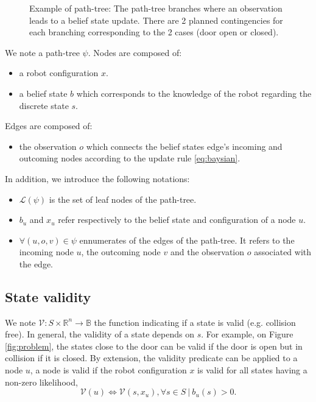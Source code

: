\documentclass[letterpaper, 10 pt, conference]{ieeeconf}  %
\begin{document}
\begin{figure}[!htb]
 \caption{Example of path-tree: The path-tree branches where an observation leads to a belief state update. There are 2 planned contingencies for each branching corresponding to the 2 cases (door open or closed).}
 \label{fig:path_tree}
\end{figure}

We note a path-tree $\psi$. Nodes are composed of:
\begin{itemize}
\item a robot configuration $x$.
\item a belief state $b$ which corresponds to the knowledge of the robot regarding the discrete state $s$.
\end{itemize}

Edges are composed of:
\begin{itemize}
\item the observation $o$ which connects the belief states edge's incoming and outcoming nodes according to the update rule \ref{eq:baysian}.
\end{itemize}

In addition, we introduce the following notations:
\begin{itemize}
\item $\mathcal{L}(\psi)$ is the set of leaf nodes of the path-tree.
\item $b_u$ and $x_u$ refer respectively to the belief state and configuration of a node $u$.
\item $\forall (u, o, v) \in \psi$ ennumerates of the edges of the path-tree. It refers to the incoming node $u$, the outcoming node $v$ and the observation $o$ associated with the edge. 
\end{itemize}

\subsection{State validity}
We note $\mathcal{V}: S \times \mathbb{R}^n \rightarrow \mathbb{B}$ the function indicating if a state is valid (e.g. collision free). In general, the validity of a state depends on $s$. For example, on Figure \ref{fig:problem}, the states close to the door can be valid if the door is open but in collision if it is closed.
By extension, the validity predicate can be applied to a node $u$, a node is valid if the robot configuration $x$ is valid for all states having a non-zero likelihood,
\begin{equation}
\mathcal{V}(u) \iff \mathcal{V}(s, x_u), \forall s \in S\ |\ b_u(s) > 0.
\end{equation}
\end{document}
